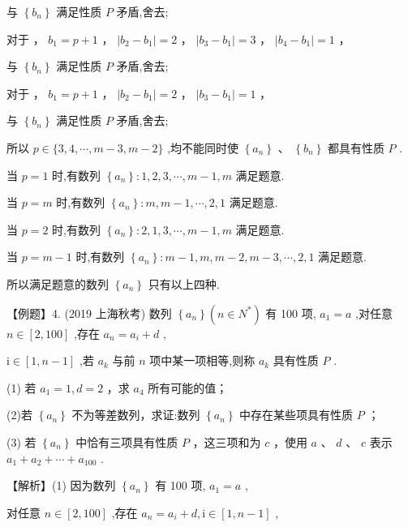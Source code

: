 \documentclass[10pt]{article}
\newcommand*\circled[1]{\tikz[baseline=(char.base)]{\node[shape=circle,draw,inner sep=1.5pt] (char) {\small #1};}}
\begin{document}
与 \(\left\{  {b}_{n}\right\}\) 满足性质 \(P\) 矛盾,舍去;

对于 \circled{3} ， \({b}_{1} = p + 1\) ， \(\left| {{b}_{2} - {b}_{1}}\right|  = 2\) ， \(\left| {{b}_{3} - {b}_{1}}\right|  = 3\) ， \(\left| {{b}_{4} - {b}_{1}}\right|  = 1\) ，

与 \(\left\{  {b}_{n}\right\}\) 满足性质 \(P\) 矛盾,舍去;

对于 \circled{4} ， \({b}_{1} = p + 1\) ， \(\left| {{b}_{2} - {b}_{1}}\right|  = 2\) ， \(\left| {{b}_{3} - {b}_{1}}\right|  = 1\) ，

与 \(\left\{  {b}_{n}\right\}\) 满足性质 \(P\) 矛盾,舍去;

所以 \(p \in  \{ 3,4,\cdots ,m - 3,m - 2\}\) ,均不能同时使 \(\left\{  {a}_{n}\right\}  \text{ 、 }\left\{  {b}_{n}\right\}\) 都具有性质 \(P\) .

当 \(p = 1\) 时,有数列 \(\left\{  {a}_{n}\right\}   : 1,2,3,\cdots ,m - 1,m\) 满足题意.

当 \(p = m\) 时,有数列 \(\left\{  {a}_{n}\right\}   : m,m - 1,\cdots ,2,1\) 满足题意.

当 \(p = 2\) 时,有数列 \(\left\{  {a}_{n}\right\}   : 2,1,3,\cdots ,m - 1,m\) 满足题意.

当 \(p = m - 1\) 时,有数列 \(\left\{  {a}_{n}\right\}   : m - 1,m,m - 2,m - 3,\cdots ,2,1\) 满足题意.

所以满足题意的数列 \(\left\{  {a}_{n}\right\}\) 只有以上四种.

【例题】4. (2019 上海秋考) 数列 \(\left\{  {a}_{n}\right\}  \left( {n \in  {N}^{ * }}\right)\) 有 100 项, \({a}_{1} = a\) ,对任意 \(n \in  \left\lbrack  {2,{100}}\right\rbrack\) ,存在 \({a}_{n} = {a}_{i} + d\) ,

\(\mathrm{i} \in  \left\lbrack  {1,n - 1}\right\rbrack\) ,若 \({a}_{k}\) 与前 \(n\) 项中某一项相等,则称 \({a}_{k}\) 具有性质 \(P\) .

(1) 若 \({a}_{1} = 1,d = 2\) ，求 \({a}_{4}\) 所有可能的值；

(2)若 \(\left\{  {a}_{n}\right\}\) 不为等差数列，求证:数列 \(\left\{  {a}_{n}\right\}\) 中存在某些项具有性质 \(P\) ；

(3) 若 \(\left\{  {a}_{n}\right\}\) 中恰有三项具有性质 \(P\) ，这三项和为 \(c\) ，使用 \(a\) 、 \(d\) 、 \(c\) 表示 \({a}_{1} + {a}_{2} + \cdots  + {a}_{100}\) .

【解析】(1) 因为数列 \(\left\{  {a}_{n}\right\}\) 有 100 项, \({a}_{1} = a\) ,

对任意 \(n \in  \left\lbrack  {2,{100}}\right\rbrack\) ,存在 \({a}_{n} = {a}_{i} + d,\mathrm{i} \in  \left\lbrack  {1,n - 1}\right\rbrack\) ,
\end{document}
